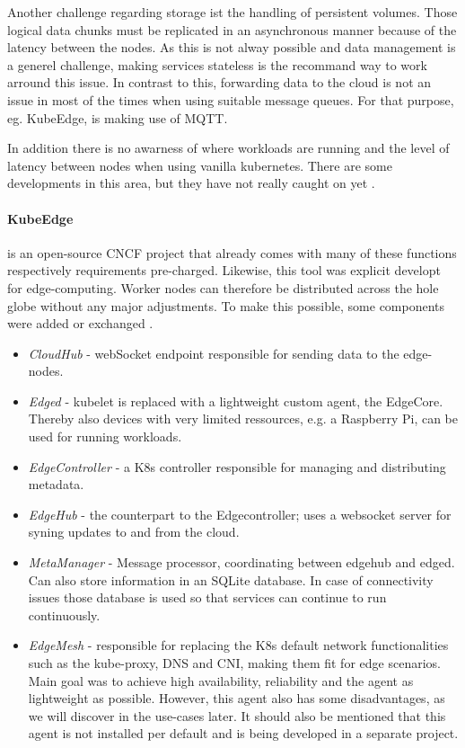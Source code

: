 \documentclass[MSC,Master,english]{twbook}%
\begin{document}
Another challenge regarding storage ist the handling of persistent volumes. Those logical data chunks must be replicated in an asynchronous manner because of the latency between the nodes. As this is not alway possible and data management is a generel challenge, making services stateless is the recommand way to work arround this issue.  In contrast to this, forwarding data to the cloud is not an issue in most of the times when using suitable message queues. For that purpose, eg. KubeEdge, is making use of \ac{MQTT}.   

In addition there is no awarness of where workloads are running and the level of latency between nodes when using vanilla kubernetes. There are some developments in this area, but they have not really caught on yet \cite{k8s-sharping-edge}\cite{tk-k8s-edge-scheduler}\cite{5g-k8s-scheduler}.

\paragraph{KubeEdge} is an open-source \ac{CNCF} project \cite{hal-kubeedge} that already comes with many of these functions respectively requirements pre-charged. Likewise, this tool was explicit developt for edge-computing.  Worker nodes can therefore be distributed across the hole globe without any major adjustments. To make this possible, some components were added or exchanged \cite{kubedge}.

\begin{itemize}
    \item \textit{CloudHub} - webSocket endpoint responsible for sending data to the edge-nodes.
    \item \textit{Edged} - kubelet is replaced with a lightweight custom agent, the EdgeCore. Thereby also devices with very limited ressources, e.g. a Raspberry Pi, can be used for running workloads.
    \item \textit{EdgeController} - a \ac{K8s} controller responsible for managing and distributing metadata.
    \item \textit{EdgeHub} - the counterpart to the Edgecontroller; uses a websocket server for syning updates to and from the cloud.
    \item \textit{MetaManager} - Message processor, coordinating between edgehub and edged. Can also store information in an SQLite database. In case of connectivity issues those database is used so that services can continue to run continuously.
    \item \textit{EdgeMesh} - responsible for replacing the \ac{K8s} default network functionalities such as the kube-proxy, \ac{DNS} and \ac{CNI}, making them fit for edge scenarios. Main goal was to achieve high availability, reliability and the agent as lightweight as possible. However, this agent also has some disadvantages, as we will discover in the use-cases later. It should also be mentioned that this agent is not installed per default and is being developed in a separate project.
\end{itemize}
\end{document}

